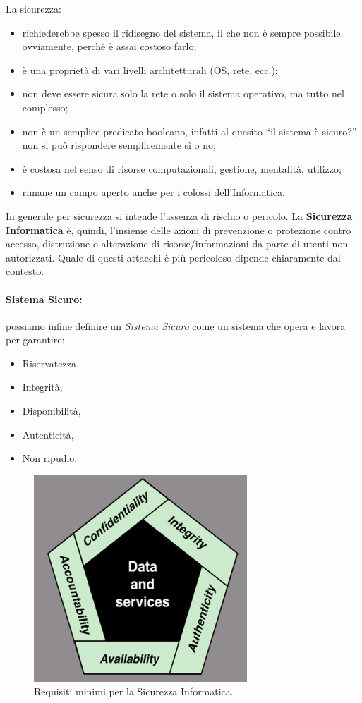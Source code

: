 La sicurezza:

\begin{itemize}
      \item richiederebbe spesso il ridisegno del sistema, il che non è sempre
            possibile, ovviamente, perché è assai costoso farlo;
      \item è una proprietà di vari livelli architetturali (OS, rete, ecc.);
      \item non deve essere sicura solo la rete o solo il sistema operativo,
            ma tutto nel complesso;
      \item non è un semplice predicato booleano, infatti al quesito
            “il sistema è sicuro?” non si può
            rispondere semplicemente sì o no;
      \item è costosa nel senso di risorse computazionali, gestione, mentalità, utilizzo;
      \item rimane un campo aperto anche per i colossi dell'Informatica.
\end{itemize}

In generale per sicurezza si intende l'assenza di rischio o pericolo.
La \textbf{Sicurezza Informatica} è, quindi, l'insieme delle azioni di prevenzione
o protezione contro accesso, distruzione o alterazione di risorse/informazioni
da parte di utenti non autorizzati. Quale di questi attacchi è più pericoloso
dipende chiaramente dal contesto.

\paragraph{Sistema Sicuro:} possiamo infine definire un \textit{Sistema Sicuro}
come un sistema che opera e lavora per garantire:

\begin{itemize}
      \item Riservatezza,
      \item Integrità,
      \item Disponibilità,
      \item Autenticità,
      \item Non ripudio.
\end{itemize}

\begin{figure}[H]
      \centering
      \includegraphics[width=8cm, keepaspectratio]{capitoli/cap_1/imgs/cia.png}
      \caption{Requisiti minimi per la Sicurezza Informatica.}
\end{figure}
